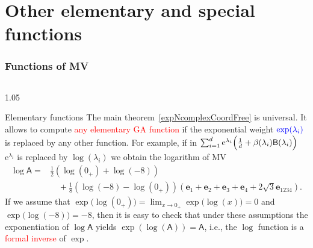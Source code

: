 \documentclass[xcolor=table,hyperref={pdfpagemode=FullScreen}]{beamer}
\newcommand{\ee}{\mathrm{e}} %
\newcommand{\e}[1]{\mathbf{e}_{#1}} %
\def\m#1{\mathsf{#1}} %
\def\m#1{\mathsf{#1}}%
\newcommand{\red}[1]{\textcolor{red}{#1}}
\newcommand{\blue}[1]{\textcolor{blue}{#1}}
\begin{document}
\section[Other functions;]{Other elementary and special functions}
\begin{frame}
\frametitle<presentation>{Functions of MV}
\vskip -15pt
\begin{columns}[t]
\begin{column}{1.05\textwidth}
  \begin{block}{Elementary functions} 
The main theorem~\eqref{expNcomplexCoordFree} is universal.
It allows to compute \red{any elementary GA function}
 if  the exponential weight $\blue{\exp(\lambda_i)}$ is replaced by any other function. 
For example, if in $\sum_{i=1}^{d} \ee^{\lambda_i}\Bigl(\frac{1}{d}+\beta(\lambda_i)\m{B}(\lambda_i)\Bigr)$   
$\ee^{\lambda_i}$ is replaced  by $\log(\lambda_i)$
we obtain the  logarithm of MV
\begin{equation*}\label{logfromexp}
\begin{split}
  \log{\m{A}}=&\frac{1}{2}(\log (0_{+})
  +\log (-8))\\
  &\quad+\frac{1}{8} (\log (-8)-\log (0_{+})) \left(\e{1}+\e{2}+\e{3}+\e{4}+2 \sqrt{3} \e{1234}\right).
\end{split}
 \end{equation*}
If we assume that $\exp\bigl(\log (0_{+})\bigr)=\lim_{x\to
0_{+}}\exp\bigl(\log (x)\bigr)=0$ and $\exp\bigl(\log
(-8)\bigr)=-8$, then it is easy to check that
under these assumptions the  exponentiation of $\log{\m{A}}$ 
    yields $\exp(\log(\m{A}))=\m{A}$, i.e., the $\log$ function is a \red{formal inverse} of $\exp$.
 \end{block}
\end{column}
\end{columns}
\end{frame}
\end{document}
